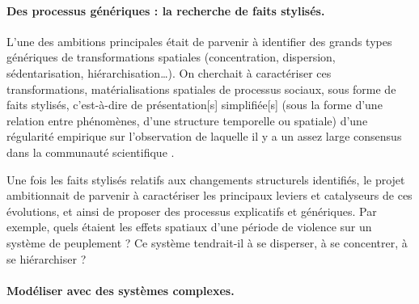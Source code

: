 \paragraph{Des processus génériques : la recherche de faits stylisés.}

L'une des ambitions principales était de parvenir à identifier des grands types génériques de transformations spatiales (concentration, dispersion, sédentarisation, hiérarchisation\ldots).
On cherchait à caractériser ces transformations, matérialisations spatiales de processus sociaux, sous forme de \og faits stylisés\fg{}, c'est-à-dire de \og présentation[s] simplifiée[s] (sous la forme d'une relation entre phénomènes, d'une structure temporelle ou spatiale) d'une régularité empirique sur l'observation de laquelle il y a un assez large consensus dans la communauté scientifique\fg{} \autocite[70]{nuninger_cadre_2017}.

Une fois les faits stylisés relatifs aux changements structurels identifiés, le projet ambitionnait de parvenir à caractériser les principaux leviers et catalyseurs de ces évolutions, et ainsi de proposer des processus explicatifs et génériques.
Par exemple, quels étaient les effets spatiaux d'une période de violence sur un système de peuplement ?
Ce système tendrait-il à se disperser, à se concentrer, à se hiérarchiser ?

\paragraph{Modéliser avec des systèmes complexes.}

